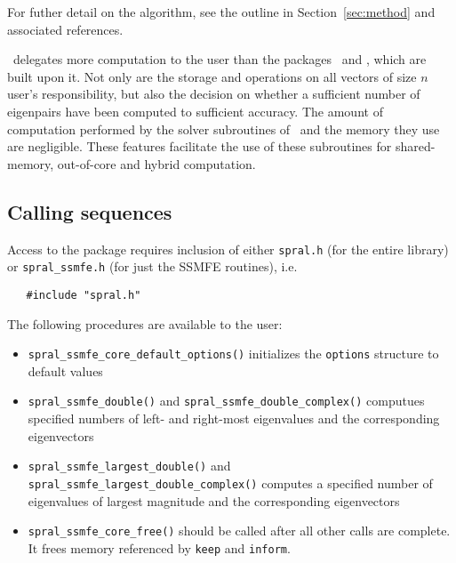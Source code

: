 For futher detail on the algorithm, see the outline in Section~\ref{sec:method}
and associated references.

\fullpackagename\ delegates 
more computation to the user than the packages
\simple\ and \advanced, which are built upon it.
Not only are the storage and operations on all vectors of size $n$
user's responsibility, but also
the decision on 
whether a sufficient number of eigenpairs have been computed
to sufficient accuracy.
The amount of computation performed by 
the solver subroutines of \fullpackagename\
and the memory they use are negligible. 
These features facilitate the use of these subroutines
for shared-memory, out-of-core and hybrid computation.

\subsection{Calling sequences}

\label{sec:call}

Access to the package requires inclusion of either \texttt{spral.h} (for the
entire \spral library) or \texttt{spral\_ssmfe.h} (for just the SSMFE routines), i.e.

\begin{verbatim}
   #include "spral.h"
\end{verbatim}

\noindent The following procedures are available to the user:
%
\vspace{-0.1cm}
\begin{itemize}
\item {\tt spral\_ssmfe\_core\_default\_options()} initializes the \texttt{options} structure to default values
\item {\tt spral\_ssmfe\_double()} and {\tt spral\_ssmfe\_double\_complex()}
computues specified numbers of left- and right-most
eigenvalues and the corresponding eigen\-vec\-tors
\item {\tt spral\_ssmfe\_largest\_double()} and
{\tt spral\_ssmfe\_largest\_double\_complex()}
computes a specified number
of eigenvalues of largest magnitude
and the cor\-res\-pon\-ding eigenvectors
\item {\tt spral\_ssmfe\_core\_free()} should be called after all other calls
are complete. It frees memory referenced by \texttt{keep} and \texttt{inform}.
\end{itemize}

